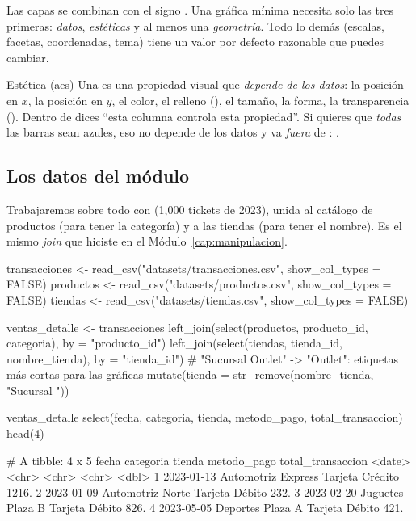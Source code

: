 Las capas se combinan con el signo \codigo{+}. Una gráfica mínima necesita
solo las tres primeras: \emph{datos}, \emph{estéticas} y al menos una
\emph{geometría}. Todo lo demás (escalas, facetas, coordenadas, tema) tiene
un valor por defecto razonable que puedes cambiar.

\begin{concepto}{Estética (aes)}
Una  es una propiedad visual que \emph{depende de los
datos}: la posición en $x$, la posición en $y$, el color, el relleno
(), el tamaño, la forma, la transparencia ().
Dentro de  dices ``esta columna controla esta propiedad''.
Si quieres que \emph{todas} las barras sean azules, eso no depende de los
datos y va \emph{fuera} de :
.
\end{concepto}

\subsection{Los datos del módulo}

Trabajaremos sobre todo con  (1,000 tickets de
2023), unida al catálogo de productos (para tener la categoría) y a las
tiendas (para tener el nombre). Es el mismo \emph{join} que hiciste en el
Módulo~\ref{cap:manipulacion}.

\begin{rcode}
transacciones <- read_csv("datasets/transacciones.csv",
                          show_col_types = FALSE)
productos <- read_csv("datasets/productos.csv", show_col_types = FALSE)
tiendas   <- read_csv("datasets/tiendas.csv", show_col_types = FALSE)

ventas_detalle <- transacciones %
  left_join(select(productos, producto_id, categoria),
            by = "producto_id") %
  left_join(select(tiendas, tienda_id, nombre_tienda),
            by = "tienda_id") %
  # "Sucursal Outlet" -> "Outlet": etiquetas más cortas para las gráficas
  mutate(tienda = str_remove(nombre_tienda, "Sucursal "))

ventas_detalle %
  select(fecha, categoria, tienda, metodo_pago, total_transaccion) %
  head(4)
\end{rcode}
\begin{rsalida}
# A tibble: 4 x 5
  fecha      categoria  tienda  metodo_pago     total_transaccion
  <date>     <chr>      <chr>   <chr>                       <dbl>
1 2023-01-13 Automotriz Express Tarjeta Crédito             1216.
2 2023-01-09 Automotriz Norte   Tarjeta Débito               232.
3 2023-02-20 Juguetes   Plaza B Tarjeta Débito               826.
4 2023-05-05 Deportes   Plaza A Tarjeta Débito               421.
\end{rsalida}

